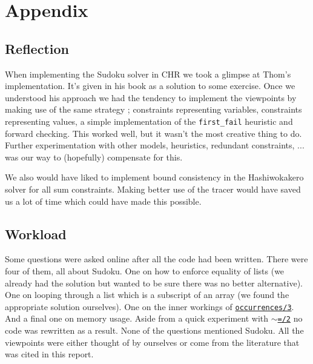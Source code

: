 \section*{Appendix}
\label{sec:appendix}

\subsection*{Reflection}\label{sec:reflection}

When implementing the Sudoku solver in CHR we took a glimpse at Thom's implementation. It's given in his book as a solution to some exercise. Once we understood his approach we had the tendency to implement the viewpoints by making use of the same strategy ; constraints representing variables, constraints representing values, a simple implementation of the \texttt{first\_fail} heuristic and forward checking. This worked well, but it wasn't the most creative thing to do. Further experimentation with other models, heuristics, redundant constraints, ... was our way to (hopefully) compensate for this.\\\par

We also would have liked to implement bound consistency in the Hashiwokakero solver for all sum constraints. Making better use of the tracer would have saved us a lot of time which could have made this possible.

\subsection*{Workload}\label{sec:workload}

Some questions were asked online after all the code had been written. There were four of them, all about Sudoku. One on how to enforce equality of lists (we already had the solution but wanted to be sure there was no better alternative). One on looping through a list which is a subscript of an array (we found the appropriate solution ourselves). One on the inner workings of \href{http://eclipseclp.org/doc/bips/lib/ic_global/occurrences-3.html}{\texttt{occurrences/3}}. And a final one on memory usage. Aside from a quick experiment with \href{https://eclipseclp.org/doc/bips/kernel/termcomp/TE-2.html}{\texttt{$\sim$=/2}} no code was rewritten as a result. None of the questions mentioned Sudoku. All the viewpoints were either thought of by ourselves or come from the literature that was cited in this report.\\\par

